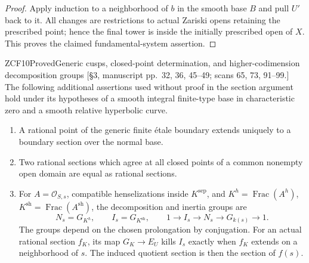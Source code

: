 \begin{proof}
Apply induction to a neighborhood of $b$ in the smooth base $B$
and pull $U'$ back to it. All changes are restrictions to actual
Zariski opens retaining the prescribed point; hence the final
tower is inside the initially prescribed open of $X$. This proves
the claimed fundamental-system assertion.
\end{proof}

\begin{result}{ZCF10}{Proved}{Generic cusps, closed-point determination, and higher-codimension decomposition groups}
\textup{[\S3, manuscript pp.\ 32, 36, 45--49; scans 65, 73,
91--99.]}
The following additional assertions used without proof in the
section argument hold under its hypotheses of a smooth integral
finite-type base in characteristic zero and a smooth relative
hyperbolic curve.
\begin{enumerate}
\item A rational point of the generic finite \'etale boundary
extends uniquely to a boundary section over the normal base.
\item Two rational sections which agree at all closed points
of a common nonempty open domain are equal as rational sections.
\item For $A=\mathcal O_{S,s}$, compatible henselizations inside
$K^{\mathrm{sep}}$, and $K^h=\operatorname{Frac}(A^h)$,
$K^{\mathrm{sh}}=\operatorname{Frac}(A^{\mathrm{sh}})$, the
decomposition and inertia groups are
\[
 N_s=G_{K^h},\qquad I_s=G_{K^{\mathrm{sh}}},\qquad
 1\to I_s\to N_s\to G_{k(s)}\to1.                         \tag{ZCF.3}
\]
The groups depend on the chosen prolongation by conjugation.
For an actual rational section $f_K$, its map $G_K\to E_U$
kills $I_s$ exactly when $f_K$ extends on a neighborhood of $s$.
The induced quotient section is then the section of $f(s)$.
\end{enumerate}
\end{result}
